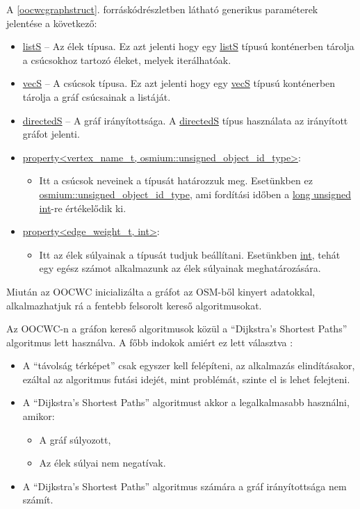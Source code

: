 \documentclass[a4paper,12pt]{report}
\begin{document}
A \ref{oocwcgraphstruct}. forráskódrészletben látható generikus paraméterek jelentése a következő:
\begin{itemize}
\item \url{listS} -- Az élek típusa. Ez azt jelenti hogy egy \url{listS} típusú konténerben tárolja a csúcsokhoz tartozó éleket, melyek iterálhatóak.
\item \url{vecS} -- A csúcsok típusa. Ez azt jelenti hogy egy \url{vecS} típusú konténerben tárolja a gráf csúcsainak a listáját.
\item \url{directedS} -- A gráf irányítottsága. A \url{directedS} típus használata az irányított gráfot jelenti.
\item \url{property<vertex_name_t, osmium::unsigned_object_id_type>}:
	  \begin{itemize}
	  \item Itt a csúcsok neveinek a típusát határozzuk meg. Esetünkben ez \url{osmium::unsigned_object_id_type}, ami fordítási időben a \url{long unsigned int}-re értékelődik ki.
	  \end{itemize}
\item \url{property<edge_weight_t, int>}:
	  \begin{itemize}
	  \item Itt az élek súlyainak a típusát tudjuk beállítani. Esetünkben \url{int}, tehát egy egész számot alkalmazunk az élek súlyainak meghatározására.
	  \end{itemize}
\end{itemize}

Miután az OOCWC inicializálta a gráfot az OSM-ből kinyert adatokkal, alkalmazhatjuk rá a fentebb felsorolt kereső algoritmusokat.

\vspace{2mm}
Az OOCWC-n a gráfon kereső algoritmusok közül a ``Dijkstra's Shortest Paths'' algoritmus lett használva. A főbb indokok amiért ez lett választva :
\begin{itemize}
\item A ``távolság térképet'' csak egyszer kell felépíteni, az alkalmazás elindításakor, ezáltal az algoritmus futási idejét, mint problémát, szinte el is lehet felejteni.
\item A ``Dijkstra's Shortest Paths'' algoritmust akkor a legalkalmasabb használni, amikor: 
	\begin{itemize}
	\item A gráf súlyozott,
	\item Az élek súlyai nem negatívak.
	\end{itemize}
\item A ``Dijkstra's Shortest Paths'' algoritmus számára a gráf irányítottsága nem számít.
\end{itemize}
\end{document}
